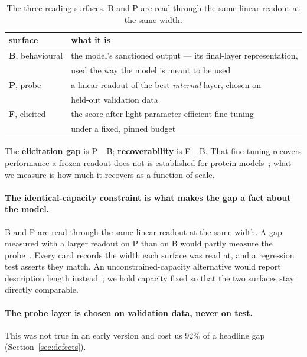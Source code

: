 \documentclass[11pt]{article}
\newcommand{\gap}{P\,$-$\,B}
\begin{document}
\begin{table}[h]
\centering
\small
\begin{tabular}{@{}ll@{}}
\toprule
\textbf{surface} & \textbf{what it is} \\
\midrule
\textbf{B}, behavioural & the model's sanctioned output --- its final-layer
representation, \\ & used the way the model is meant to be used \\
\addlinespace[2pt]
\textbf{P}, probe & a linear readout of the best \emph{internal} layer, chosen on
\\ & held-out validation data \\
\addlinespace[2pt]
\textbf{F}, elicited & the score after light parameter-efficient
fine-tuning~\citep{hu2021lora} \\ & under a fixed, pinned budget \\
\bottomrule
\end{tabular}
\caption{The three reading surfaces. B and P are read through the same linear
readout at the same width.}
\label{tab:surfaces}
\end{table}

The \textbf{elicitation gap} is \gap; \textbf{recoverability} is F\,$-$\,B. That
fine-tuning recovers performance a frozen readout does not is established for
protein models~\citep{schmirler2024finetuning}; what we measure is how much it
recovers as a function of scale.

\paragraph{The identical-capacity constraint is what makes the gap a fact about
the model.} B and P are read through the same linear readout at the same width. A
gap measured with a larger readout on P than on B would partly measure the
probe~\citep{hewitt2019control,belinkov2022probing}. Every card records the width
each surface was read at, and a regression test asserts they match. An
unconstrained-capacity alternative would report description length
instead~\citep{voita2020mdl}; we hold capacity fixed so that the two surfaces stay
directly comparable.

\paragraph{The probe layer is chosen on validation data, never on test.} This was
not true in an early version and cost us 92\% of a headline gap
(Section~\ref{sec:defects}).
\end{document}
